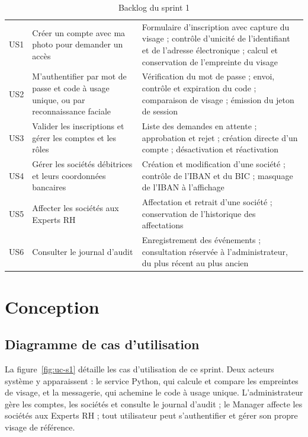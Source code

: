 \begin{table}[H]
\centering
\footnotesize
\renewcommand{\arraystretch}{1.1}
\tablestyle
\begin{tabularx}{\textwidth}{|>{\centering\arraybackslash}p{0.9cm}|>{\raggedright\arraybackslash}p{5.2cm}|Y|}
\hline
{} &  &  \\
\hline
US1 & Créer un compte avec ma photo pour demander un accès & Formulaire d'inscription avec capture du visage ; contrôle d'unicité de l'identifiant et de l'adresse électronique ; calcul et conservation de l'empreinte du visage \\
\hline
US2 & M'authentifier par mot de passe et code à usage unique, ou par reconnaissance faciale & Vérification du mot de passe ; envoi, contrôle et expiration du code ; comparaison de visage ; émission du jeton de session \\
\hline
US3 & Valider les inscriptions et gérer les comptes et les rôles & Liste des demandes en attente ; approbation et rejet ; création directe d'un compte ; désactivation et réactivation \\
\hline
US4 & Gérer les sociétés débitrices et leurs coordonnées bancaires & Création et modification d'une société ; contrôle de l'IBAN et du BIC ; masquage de l'IBAN à l'affichage \\
\hline
US5 & Affecter les sociétés aux Experts RH & Affectation et retrait d'une société ; conservation de l'historique des affectations \\
\hline
US6 & Consulter le journal d'audit & Enregistrement des événements ; consultation réservée à l'administrateur, du plus récent au plus ancien \\
\hline
\end{tabularx}
\caption{Backlog du sprint 1}
\label{tab:backlog-s1}
\end{table}

\section{Conception}

\subsection{Diagramme de cas d'utilisation}

La figure~\ref{fig:uc-s1} détaille les cas d'utilisation de ce sprint. Deux acteurs système y apparaissent : le service Python, qui calcule et compare les empreintes de visage, et la messagerie, qui achemine le code à usage unique. L'administrateur gère les comptes, les sociétés et consulte le journal d'audit ; le Manager affecte les sociétés aux Experts RH ; tout utilisateur peut s'authentifier et gérer son propre visage de référence.

